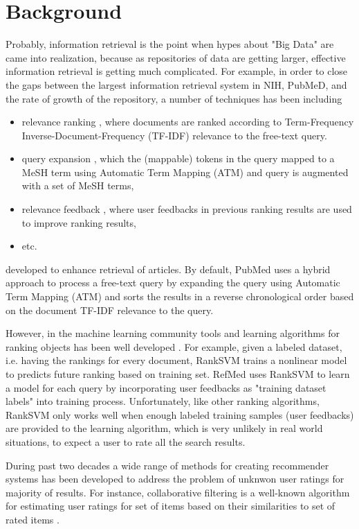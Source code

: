 \documentclass[twoside,11pt]{article}
\begin{document}
\section{Background} \label{sec:background}
Probably, information retrieval is the point when hypes about "Big Data" are came into realization, because as repositories of data are getting larger, effective information retrieval is getting much complicated. For example, in order to close the gaps between the largest information retrieval system in NIH, PubMeD, and the rate of growth of the repository, a number of techniques has been including
\begin{itemize}
\item relevance ranking \cite{ranking-medline}, where documents are ranked according to Term-Frequency Inverse-Document-Frequency (TF-IDF) relevance to the free-text query.
\item query expansion \cite{mesh-query}, which the (mappable) tokens in the query mapped to a MeSH term using Automatic Term Mapping (ATM) \cite{pubmed-atm} and query is augmented with a set of MeSH terms,
\item relevance feedback \cite{refmed}, where user feedbacks in previous ranking results are used to improve ranking results,
\item etc. \cite{pubmed-survey}
\end{itemize}
developed to enhance retrieval of articles. By default, PubMed uses a hybrid approach to process a free-text query \cite{pubmed-help} by expanding the query using Automatic Term Mapping (ATM) \cite{pubmed-atm} and sorts the results in a reverse chronological order based on the document TF-IDF relevance to the query.

However, in the machine learning community tools and learning algorithms for ranking objects has been well developed \cite{yahoo-rank-challange}. For example, given a labeled dataset, i.e. having the rankings for every document, RankSVM \citep{svm-rank-j} trains a nonlinear model to predicts future ranking based on training set. RefMed \cite{refmed} uses RankSVM to learn a model for each query by incorporating user feedbacks as "training dataset labels" into training process. Unfortunately, like other ranking algorithms, RankSVM only works well when enough labeled training samples (user feedbacks) are provided to the learning algorithm, which is very unlikely in real world situations, to expect a user to rate all the search results.

During past two decades a wide range of methods for creating recommender systems has been developed \cite{recommender-survey} to address the problem of unknwon user ratings for majority of results. For instance, collaborative filtering is a well-known algorithm for estimating user ratings for set of items based on their similarities to set of rated items \cite{cff-survey}.
\end{document}
